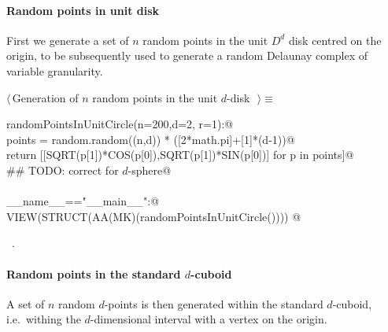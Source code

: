 \documentclass[11pt,oneside]{article}	%
\begin{document}
\paragraph{Random points in unit disk} 
First we generate a  set of $n$ random points in the unit $D^d$ disk centred on the origin, to be subsequently used to generate a random Delaunay complex of variable granularity.

\begin{flushleft} \small \label{scrap23}
$\langle\,$Generation of $n$ random points in the unit $d$-disk\nobreak\ {\footnotesize {}}$\,\rangle\equiv$
\vspace{-1ex}
\begin{list}{}{} \item
\mbox{}\verb@def randomPointsInUnitCircle(n=200,d=2, r=1):@\\
\mbox{}\verb@   points = random.random((n,d)) * ([2*math.pi]+[1]*(d-1))@\\
\mbox{}\verb@   return [[SQRT(p[1])*COS(p[0]),SQRT(p[1])*SIN(p[0])] for p in points]@\\
\mbox{}\verb@   ## TODO: correct for $d$-sphere@\\
\mbox{}\verb@@\\
\mbox{}\verb@if __name__=="__main__":@\\
\mbox{}\verb@   VIEW(STRUCT(AA(MK)(randomPointsInUnitCircle()))) @\\
\mbox{}\verb@@{\NWsep}
\end{list}
\vspace{-1ex}
\footnotesize\addtolength{\baselineskip}{-1ex}
\begin{list}{}{\setlength{\itemsep}{-\parsep}\setlength{\itemindent}{-\leftmargin}}
\item \NWtxtMacroRefIn\ .
\end{list}
\end{flushleft}

\paragraph{Random points in the standard $d$-cuboid} 
A set of $n$ random $d$-points is then generated within the standard $d$-cuboid, i.e.~withing the $d$-dimensional interval with a vertex on the origin.
\end{document}
